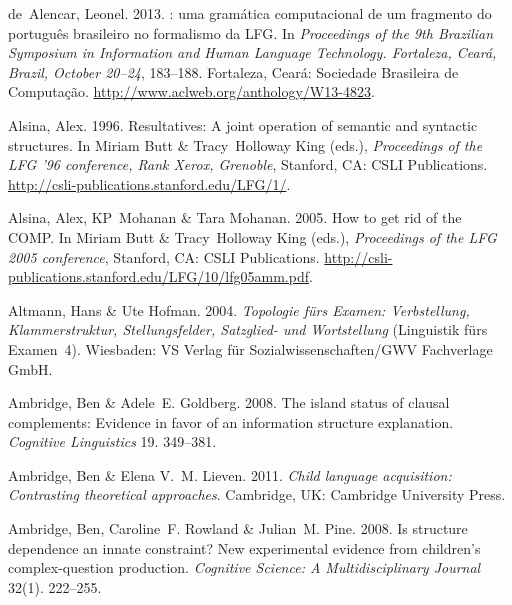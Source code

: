 \begin{thebibliography}{1420}
de~Alencar, Leonel. 2013.
: uma gram{\'a}tica computacional de um fragmento do
  portugu{\^e}s brasileiro no formalismo da {LFG}.
\newblock In \emph{Proceedings of the 9th {Brazilian Symposium in Information
  and Human Language Technology. Fortaleza, Cear{\'a}, Brazil, October
  20--24}}, 183--188. Fortaleza, Cear{\'a}: Sociedade Brasileira de Computa{\c
  c}{\~a}o.
\newblock \urlprefix\url{http://www.aclweb.org/anthology/W13-4823}.

Alsina, Alex. 1996.
\newblock Resultatives: {A} joint operation of semantic and syntactic
  structures.
\newblock In Miriam Butt \& Tracy~Holloway King (eds.), \emph{Proceedings of
  the {LFG '96} conference, {Rank Xerox, Grenoble}}, Stanford, CA: CSLI
  Publications.
\newblock \urlprefix\url{http://csli-publications.stanford.edu/LFG/1/}.

Alsina, Alex, KP~Mohanan \& Tara Mohanan. 2005.
\newblock How to get rid of the {COMP}.
\newblock In Miriam Butt \& Tracy~Holloway King (eds.), \emph{Proceedings of
  the {LFG 2005} conference}, Stanford, CA: CSLI Publications.
\newblock
  \urlprefix\url{http://csli-publications.stanford.edu/LFG/10/lfg05amm.pdf}.

Altmann, Hans \& Ute Hofman. 2004.
\newblock \emph{{Topologie f{\"u}rs Examen: Verbstellung, Klammerstruktur,
  Stellungsfelder, Satzglied- und Wortstellung}} (Linguistik f{\"u}rs
  Examen~4).
\newblock Wiesbaden: VS Verlag f{\"u}r Sozialwissenschaften/GWV Fachverlage
  GmbH.

Ambridge, Ben \& Adele~E. Goldberg. 2008.
\newblock The island status of clausal complements: {Evidence} in favor of an
  information structure explanation.
\newblock \emph{Cognitive Linguistics} 19. 349--381.

Ambridge, Ben \& Elena V.~M. Lieven. 2011.
\newblock \emph{Child language acquisition: {Contrasting} theoretical
  approaches}.
\newblock Cambridge, UK: Cambridge University Press.

Ambridge, Ben, Caroline~F. Rowland \& Julian~M. Pine. 2008.
\newblock Is structure dependence an innate constraint? {New} experimental
  evidence from children's complex-question production.
\newblock \emph{Cognitive Science: A Multidisciplinary Journal} 32(1).
  222--255.


\end{thebibliography}
